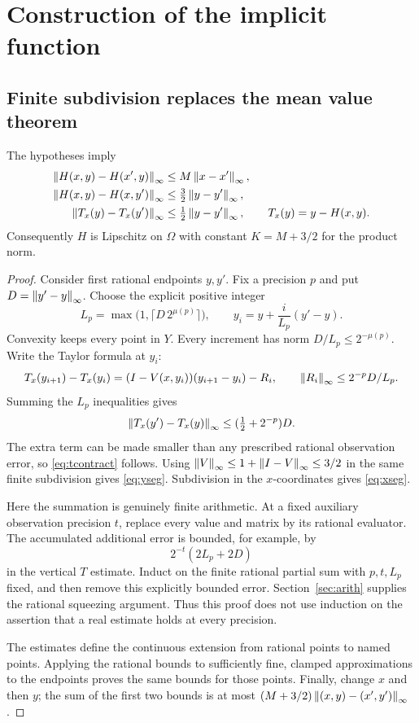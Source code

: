 \section{Construction of the implicit function}\label{sec:construction}

\subsection{Finite subdivision replaces the mean value theorem}

\begin{lemma}\label{lem:segment}
The hypotheses imply
\begin{align}
 \left\lVert H(x,y)-H(x',y)\right\rVert_\infty&\le M\left\lVert x-x'\right\rVert_\infty,\label{eq:xseg}\\
 \left\lVert H(x,y)-H(x,y')\right\rVert_\infty&\le\tfrac32\left\lVert y-y'\right\rVert_\infty,\label{eq:yseg}\\
 \left\lVert T_x(y)-T_x(y')\right\rVert_\infty&\le\tfrac12\left\lVert y-y'\right\rVert_\infty,
 \qquad T_x(y)=y-H(x,y).\label{eq:tcontract}
\end{align}
Consequently \(H\) is Lipschitz on \(\Omega\) with constant
\(K=M+3/2\) for the product norm.
\end{lemma}

\begin{proof}
Consider first rational endpoints \(y,y'\). Fix a precision \(p\)
and put \(D=\left\lVert y'-y\right\rVert_\infty\). Choose the explicit positive integer
\[
 L_p=\max\bigl(1,\lceil D\,2^{\mu(p)}\rceil\bigr),
 \qquad y_i=y+\frac{i}{L_p}(y'-y).
\]
Convexity keeps every point in \(Y\). Every increment has norm
\(D/L_p\le2^{-\mu(p)}\). Write the Taylor formula at \(y_i\):
\[
 T_x(y_{i+1})-T_x(y_i)
  =(I-V(x,y_i))(y_{i+1}-y_i)-R_i,
 \qquad \left\lVert R_i\right\rVert_\infty\le2^{-p}D/L_p.
\]
Summing the \(L_p\) inequalities gives
\[
 \left\lVert T_x(y')-T_x(y)\right\rVert_\infty
 \le(\tfrac12+2^{-p})D.
\]
The extra term can be made smaller than any prescribed rational
observation error, so \eqref{eq:tcontract} follows. Using
\(\left\lVert V\right\rVert_\infty\le1+\left\lVert I-V\right\rVert_\infty\le3/2\) in the same finite subdivision
gives \eqref{eq:yseg}. Subdivision in the \(x\)-coordinates gives
\eqref{eq:xseg}.

Here the summation is genuinely finite arithmetic. At a fixed
auxiliary observation precision \(t\), replace every value and
matrix by its rational evaluator. The accumulated additional error
is bounded, for example, by
\[
 2^{-t}(2L_p+2D)
\]
in the vertical \(T\) estimate. Induct on the finite rational
partial sum with \(p,t,L_p\) fixed, and then remove this explicitly
bounded error. Section~\ref{sec:arith} supplies the rational
squeezing argument. Thus this proof does not use induction on
the assertion that a real estimate holds at every precision.

The estimates define the continuous extension from rational points
to named points. Applying the rational bounds to sufficiently fine,
clamped approximations to the endpoints proves the same bounds
for those points. Finally, change \(x\) and then \(y\); the sum of
the first two bounds is at most
\((M+3/2)\left\lVert(x,y)-(x',y')\right\rVert_\infty\).
\end{proof}

